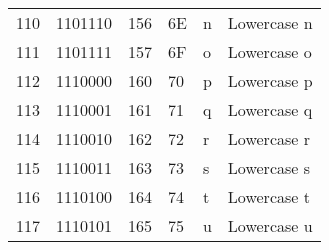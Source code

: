 \begin{center}
\begin{longtable}{llllll}
\rowcolor[HTML]{F3F6F6} 
{\color[HTML]{404040} 110}              & {\color[HTML]{404040} 1101110}         & {\color[HTML]{404040} 156}            & {\color[HTML]{404040} 6E}                   & {\color[HTML]{404040} n}                  & {\color[HTML]{404040} Lowercase n}                           \\
\rowcolor[HTML]{FCFCFC} 
{\color[HTML]{404040} 111}              & {\color[HTML]{404040} 1101111}         & {\color[HTML]{404040} 157}            & {\color[HTML]{404040} 6F}                   & {\color[HTML]{404040} o}                  & {\color[HTML]{404040} Lowercase o}                           \\
\rowcolor[HTML]{F3F6F6} 
{\color[HTML]{404040} 112}              & {\color[HTML]{404040} 1110000}         & {\color[HTML]{404040} 160}            & {\color[HTML]{404040} 70}                   & {\color[HTML]{404040} p}                  & {\color[HTML]{404040} Lowercase p}                           \\
\rowcolor[HTML]{FCFCFC} 
{\color[HTML]{404040} 113}              & {\color[HTML]{404040} 1110001}         & {\color[HTML]{404040} 161}            & {\color[HTML]{404040} 71}                   & {\color[HTML]{404040} q}                  & {\color[HTML]{404040} Lowercase q}                           \\
\rowcolor[HTML]{F3F6F6} 
{\color[HTML]{404040} 114}              & {\color[HTML]{404040} 1110010}         & {\color[HTML]{404040} 162}            & {\color[HTML]{404040} 72}                   & {\color[HTML]{404040} r}                  & {\color[HTML]{404040} Lowercase r}                           \\
\rowcolor[HTML]{FCFCFC} 
{\color[HTML]{404040} 115}              & {\color[HTML]{404040} 1110011}         & {\color[HTML]{404040} 163}            & {\color[HTML]{404040} 73}                   & {\color[HTML]{404040} s}                  & {\color[HTML]{404040} Lowercase s}                           \\
\rowcolor[HTML]{F3F6F6} 
{\color[HTML]{404040} 116}              & {\color[HTML]{404040} 1110100}         & {\color[HTML]{404040} 164}            & {\color[HTML]{404040} 74}                   & {\color[HTML]{404040} t}                  & {\color[HTML]{404040} Lowercase t}                           \\
\rowcolor[HTML]{FCFCFC} 
{\color[HTML]{404040} 117}              & {\color[HTML]{404040} 1110101}         & {\color[HTML]{404040} 165}            & {\color[HTML]{404040} 75}                   & {\color[HTML]{404040} u}                  & {\color[HTML]{404040} Lowercase u}                           \\

\end{longtable}
\end{center}

